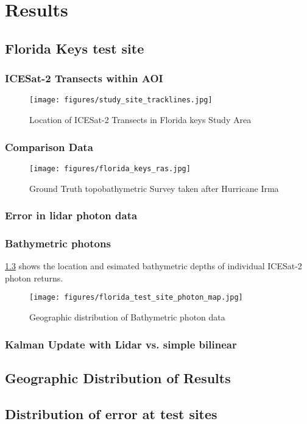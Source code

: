 \chapter{Results}
\section{Florida Keys test site}
\subsection{ICESat-2 Transects within AOI}
\begin{figure}[h!]
    \centering
    \texttt{[image: figures/study\_site\_tracklines.jpg]}
    \caption{Location of ICESat-2 Transects in Florida keys Study Area}
    \label{fig:keys_transects}
\end{figure}
\subsection{Comparison Data}

\begin{figure}[h!]
    \centering
    \texttt{[image: figures/florida\_keys\_ras.jpg]}
    \caption{Ground Truth topobathymetric Survey taken after Hurricane Irma}
    \label{fig:truebathy}
\end{figure}
\subsection{Error in lidar photon data}

% 

% 

\subsection{Bathymetric photons}
\ref{fig:bathyphotonmap} shows the location and esimated bathymetric depths of individual ICESat-2 photon returns.
\begin{figure}[h!]
    \centering
    \texttt{[image: figures/florida\_test\_site\_photon\_map.jpg]}
    \caption{Geographic distribution of Bathymetric photon data}
    \label{fig:bathyphotonmap}
\end{figure}

\subsection{Kalman Update with Lidar vs. simple bilinear}

\section{Geographic Distribution of Results}
\section{Distribution of error at test sites}